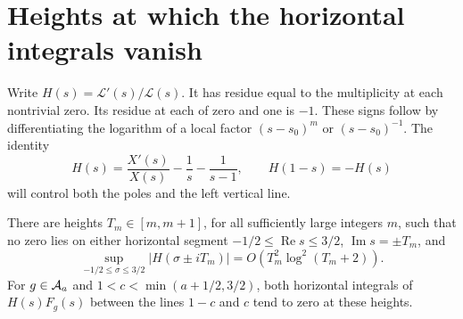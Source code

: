 \section{Heights at which the horizontal integrals vanish}
\label{sec:heights}

Write $H(s)=\mathcal L'(s)/\mathcal L(s)$.
It has residue equal to the multiplicity at each nontrivial zero.
Its residue at each of zero and one is $-1$.
These signs follow by differentiating the logarithm of a local factor
$(s-s_0)^m$ or $(s-s_0)^{-1}$.
The identity
\begin{equation}
 H(s)=\frac{X'(s)}{X(s)}-\frac1s-\frac1{s-1},
 \qquad H(1-s)=-H(s)
 \label{eq:log-reflection}
\end{equation}
will control both the poles and the left vertical line.

\begin{lemma}
There are heights\label{lem:heights} $T_m\in[m,m+1]$, for all sufficiently large integers $m$,
such that no zero lies on either horizontal segment
$-1/2\leq\operatorname{Re}s\leq3/2$, $\operatorname{Im}s=\pm T_m$,
and
\begin{equation}
 \sup_{-1/2\leq\sigma\leq3/2}|H(\sigma\pm iT_m)|
       =O(T_m^2\log^2(T_m+2)).
 \label{eq:horizontal-H}
\end{equation}
For $g\in\mathcal A_a$ and $1<c<\min(a+1/2,3/2)$, both horizontal integrals
of $H(s)F_g(s)$ between the lines $1-c$ and $c$ tend to zero at these heights.
\end{lemma}


